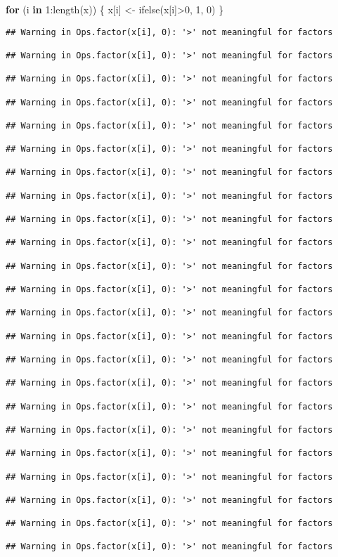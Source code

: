 \documentclass[
]{article}
\newenvironment{Shaded}{\begin{snugshade}}{\end{snugshade}}
\newcommand{\ControlFlowTok}[1]{\textcolor[rgb]{0.13,0.29,0.53}{\textbf{#1}}}
\newcommand{\DecValTok}[1]{\textcolor[rgb]{0.00,0.00,0.81}{#1}}
\newcommand{\FunctionTok}[1]{\textcolor[rgb]{0.00,0.00,0.00}{#1}}
\newcommand{\NormalTok}[1]{#1}
\newcommand{\OtherTok}[1]{\textcolor[rgb]{0.56,0.35,0.01}{#1}}
\newcommand{\SpecialCharTok}[1]{\textcolor[rgb]{0.00,0.00,0.00}{#1}}
\begin{document}
\begin{Shaded}
\begin{Highlighting}[]
\ControlFlowTok{for}\NormalTok{ (i }\ControlFlowTok{in} \DecValTok{1}\SpecialCharTok{:}\FunctionTok{length}\NormalTok{(x)) \{}
\NormalTok{  x[i] }\OtherTok{\textless{}{-}} \FunctionTok{ifelse}\NormalTok{(x[i]}\SpecialCharTok{\textgreater{}}\DecValTok{0}\NormalTok{, }\DecValTok{1}\NormalTok{, }\DecValTok{0}\NormalTok{)}
\NormalTok{\}}
\end{Highlighting}
\end{Shaded}

\begin{verbatim}
## Warning in Ops.factor(x[i], 0): '>' not meaningful for factors

## Warning in Ops.factor(x[i], 0): '>' not meaningful for factors

## Warning in Ops.factor(x[i], 0): '>' not meaningful for factors

## Warning in Ops.factor(x[i], 0): '>' not meaningful for factors

## Warning in Ops.factor(x[i], 0): '>' not meaningful for factors

## Warning in Ops.factor(x[i], 0): '>' not meaningful for factors

## Warning in Ops.factor(x[i], 0): '>' not meaningful for factors

## Warning in Ops.factor(x[i], 0): '>' not meaningful for factors

## Warning in Ops.factor(x[i], 0): '>' not meaningful for factors

## Warning in Ops.factor(x[i], 0): '>' not meaningful for factors

## Warning in Ops.factor(x[i], 0): '>' not meaningful for factors

## Warning in Ops.factor(x[i], 0): '>' not meaningful for factors

## Warning in Ops.factor(x[i], 0): '>' not meaningful for factors

## Warning in Ops.factor(x[i], 0): '>' not meaningful for factors

## Warning in Ops.factor(x[i], 0): '>' not meaningful for factors

## Warning in Ops.factor(x[i], 0): '>' not meaningful for factors

## Warning in Ops.factor(x[i], 0): '>' not meaningful for factors

## Warning in Ops.factor(x[i], 0): '>' not meaningful for factors

## Warning in Ops.factor(x[i], 0): '>' not meaningful for factors

## Warning in Ops.factor(x[i], 0): '>' not meaningful for factors

## Warning in Ops.factor(x[i], 0): '>' not meaningful for factors

## Warning in Ops.factor(x[i], 0): '>' not meaningful for factors

## Warning in Ops.factor(x[i], 0): '>' not meaningful for factors
\end{verbatim}
\end{document}
